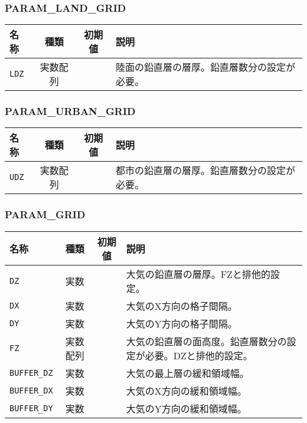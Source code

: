 \subsubsection{PARAM\_LAND\_GRID}
\begin{tabularx}{150mm}{|l|c|c|X|} \hline
 \rowcolor[gray]{0.9} 名称 & 種類 & 初期値 & 説明 \\ \hline
 \verb|LDZ| & 実数配列 &  & 陸面の鉛直層の層厚。鉛直層数分の設定が必要。 \\ \hline
\end{tabularx}


\subsubsection{PARAM\_URBAN\_GRID}
\begin{tabularx}{150mm}{|l|c|c|X|} \hline
 \rowcolor[gray]{0.9} 名称 & 種類 & 初期値 & 説明 \\ \hline
 \verb|UDZ| & 実数配列 &  & 都市の鉛直層の層厚。鉛直層数分の設定が必要。 \\ \hline
\end{tabularx}


\subsubsection{PARAM\_GRID}
\begin{tabularx}{150mm}{|l|c|c|X|} \hline
 \rowcolor[gray]{0.9} 名称 & 種類 & 初期値 & 説明 \\ \hline
 \verb|DZ| & 実数 &  & 大気の鉛直層の層厚。FZと排他的設定。 \\ \hline
 \verb|DX| & 実数 &  & 大気のX方向の格子間隔。\\ \hline
 \verb|DY| & 実数 &  & 大気のY方向の格子間隔。\\ \hline
 \verb|FZ| & 実数配列 &  & 大気の鉛直層の面高度。鉛直層数分の設定が必要。DZと排他的設定。 \\ \hline
 \verb|BUFFER_DZ| & 実数 &  & 大気の最上層の緩和領域幅。 \\ \hline
 \verb|BUFFER_DX| & 実数 &  & 大気のX方向の緩和領域幅。\\ \hline
 \verb|BUFFER_DY| & 実数 &  & 大気のY方向の緩和領域幅。\\ \hline
\end{tabularx}


